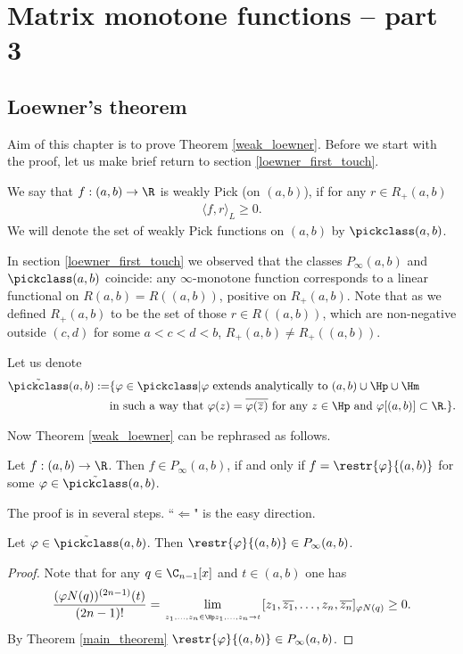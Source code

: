 \chapter{Matrix monotone functions -- part 3}

\section{Loewner's theorem}

Aim of this chapter is to prove Theorem \ref{weak_loewner}. Before we start with the proof, let us make brief return to section \ref{loewner_first_touch}.

\begin{maar}
	We say that $f : (a, b) \to \R$ is weakly Pick (on $(a, b)$), if for any $r \in R_{+}(a, b)$
	\begin{align*}
		\langle f, r\rangle_{L} \geq 0.
	\end{align*}
	We will denote the set of weakly Pick functions on $(a, b)$ by $\pickclass(a, b)$.
\end{maar}

In section \ref{loewner_first_touch} we observed that the classes $P_{\infty}(a, b)$ and  $\pickclass(a, b)$ coincide: any $\infty$-monotone function corresponds to a linear functional on $R(a, b) = R((a, b))$, positive on $R_{+}(a, b)$. Note that as we defined $R_{+}(a, b)$ to be the set of those $r \in R((a, b))$, which are non-negative outside $(c, d)$ for some $a < c < d < b$, $R_{+}(a, b) \neq R_{+}((a, b))$.

Let us denote
\begin{align*}
	\tilde{\pickclass}(a, b) :=& \{\varphi \in \pickclass | \text{$\varphi$ extends analytically to $(a, b) \cup \Hp \cup \Hm$} \\
	&\text{in such a way that $\varphi(z) = \overline{\varphi(\overline{z})}$ for any $z \in \Hp$ and $\varphi[(a, b)] \subset \R.$}\}.
\end{align*}

Now Theorem \ref{weak_loewner} can be rephrased as follows.
\begin{lause}\label{better_weak_loewner}
	Let $f : (a, b) \to \R$. Then $f \in P_{\infty}(a, b)$, if and only if $f = \restr{\varphi}{(a, b)}$ for some $\varphi \in \tilde{\pickclass}(a, b)$.
\end{lause}

The proof is in several steps. ``$\Leftarrow$" is the easy direction.
\begin{lem}\label{loewner_easy}
	Let $\varphi \in \tilde{\pickclass}(a, b)$. Then $\restr{\varphi}{(a, b)} \in P_{\infty}(a, b)$.
\end{lem}
\begin{proof}
	Note that for any $q \in \C_{n - 1}[x]$ and $t \in (a, b)$ one has
	\begin{align*}
		\frac{(\varphi N(q))^{(2 n - 1)}(t)}{(2 n - 1)!} = \lim_{\atop{z_{1}, \ldots, z_{n} \in \Hp}{z_{1}, \ldots, z_{n} \to t}} [z_{1}, \overline{z_{1}}, \ldots, z_{n}, \overline{z_{n}}]_{\varphi N(q)} \geq 0.
	\end{align*}
	By Theorem \ref{main_theorem} $\restr{\varphi}{(a, b)} \in P_{\infty}(a, b)$.
\end{proof}

